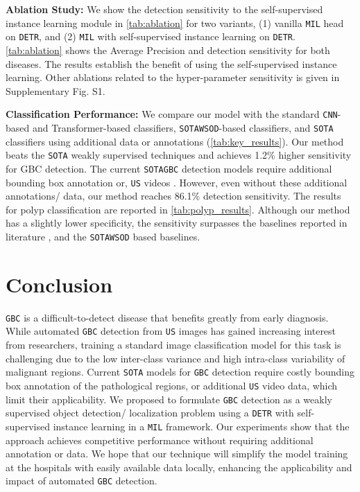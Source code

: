 \documentclass[runningheads]{llncs}
\newcommand{\myfirstpara}[1]{\par \noindent \textbf{#1:}}
\newcommand{\mypara}[1]{ \myfirstpara{#1}}
\def\cnn{\texttt{CNN}\xspace}
\def\sota{\texttt{SOTA}\xspace}
\def\gbc{\texttt{GBC}\xspace}
\def\us{\texttt{US}\xspace}
\def\wsod{\texttt{WSOD}\xspace}
\def\mil{\texttt{MIL}\xspace}
\def\detr{\texttt{DETR}\xspace}
\begin{document}
\mypara{Ablation Study}
%
We show the detection sensitivity to the self-supervised instance learning module in \cref{tab:ablation} for two variants, (1) vanilla \mil head on \detr, and (2) \mil with self-supervised instance learning on \detr. \cref{tab:ablation} shows the Average Precision and detection sensitivity for both diseases. The results establish the benefit of using the self-supervised instance learning. Other ablations related to the hyper-parameter sensitivity is given in Supplementary Fig. S1.

\mypara{Classification Performance}
%
We compare our model with the standard \cnn-based and Transformer-based classifiers, \sota \wsod-based classifiers, and \sota classifiers using additional data or annotations (\cref{tab:key_results}). Our method beats the \sota weakly supervised techniques and achieves 1.2\% higher sensitivity for GBC detection. The current \sota \gbc detection models require additional bounding box annotation \cite{basu2022surpassing} or, \us videos \cite{basu2022unsupervised,uscl}. However, even without these additional annotations/ data, our method reaches 86.1\% detection sensitivity. The results for polyp classification are reported in \cref{tab:polyp_results}. Although our method has a slightly lower specificity, the sensitivity surpasses the baselines reported in literature \cite{jha2021real}, and the \sota \wsod based baselines. 

%
%
\section{Conclusion}
%
\gbc is a difficult-to-detect disease that benefits greatly from early diagnosis. 
While automated \gbc detection from \us images has gained increasing interest from researchers, training a standard image classification model for this task is challenging due to the low inter-class variance and high intra-class variability of malignant regions. 
Current \sota models for \gbc detection require costly bounding box annotation of the pathological regions, or additional \us video data, which limit their applicability. We proposed to formulate \gbc detection as a weakly supervised object detection/ localization problem using a \detr with self-supervised instance learning in a \mil framework. Our experiments show that the approach achieves competitive performance without requiring additional annotation or data. We hope that our technique will simplify the model training at the hospitals with easily available data locally, enhancing the applicability and impact of automated \gbc detection. 

%
%


\end{document}
